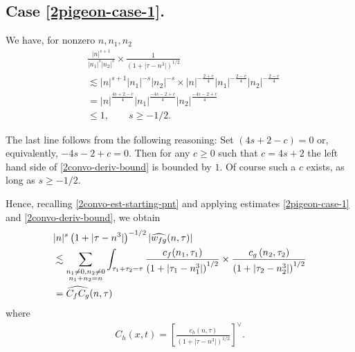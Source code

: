 \subsection{Case \ref{2pigeon-case-1}.} 
We have, for nonzero $ n, n_1, n_2 $
%
\begin{equation}
	\label{2convo-deriv-bound}
	\begin{split}
		& \frac{|n|^{s+1}}{|n_1|^s 
		| n_2|^s}
		\times
		\frac{1}{(1 + | \tau -n^{3} |)^{1/2}}
		\\
		& \lesssim | n |^{s+1}| n_1 |^{-s}| n_2 |^{-s} \times | n
		|^{-\frac{2+c}{4}}| n_1 |^{-\frac{2-c}{4}}| n_2 |^{-\frac{2-c}{4}} 
		\\
		& = | n |^{\frac{4s +2 -c}{4}} | n_1 |^{\frac{-4s -2 +c}{4}} | n_2
		|^{\frac{-4s -2 +c}{4}}
		\\
		& \le 1, \qquad s \ge -1/2.
	\end{split}  
\end{equation}
%
%
\begin{remark}
	\label{2rem:s-val}
	The last line follows from the following reasoning: Set $(4s + 2 -c) = 0$
or, equivalently, $-4s -2 +c = 0$. Then for any $c \ge 0$ such that $c = 4s+2$
the left hand side of
\eqref{2convo-deriv-bound} is bounded by $1$. Of course such a $c$ exists, as long as $s \ge -1/2$. 
\end{remark}
%
%
%
Hence, recalling \eqref{2convo-est-starting-pnt} and applying estimates 
\eqref{2pigeon-case-1} and \eqref{2convo-deriv-bound}, we obtain
%
%
\begin{equation}
	\label{2non-lin-rep-with-bound}
	\begin{split}
		& |n|^s \left( 1 + | \tau - n^3 | \right)^{-1/2} | 
		\widehat{w_{fg}}(n, \tau) | 
		\\
		& \lesssim \sum_{\substack{n_1 \neq0, n_2 \neq 0 \\n_1 + n_2 =n}} \int_{\tau_1 + \tau_2 = \tau}\frac{c_f(n_1, \tau_1)}{\left( 1 + | 
		\tau_1 -  n_1^3| \right)^{1/2}}
		\times \frac{c_g\left( n_2, \tau_2\right)}{\left( 1 + | \tau_2 -n_2^3|
		\right)^{1/2}}
		\\
		& = \widehat{C_f C_g}(n, \tau)
	\end{split}
\end{equation}
%
%
where
\begin{equation*}
	\begin{split}
		C_h(x,t) =
		\left[ \frac{c_h(n, \tau)}{\left( 1 + | \tau - n^3 | 
		\right)^{1/2}}\right]^\vee.	
	\end{split}
\end{equation*}

